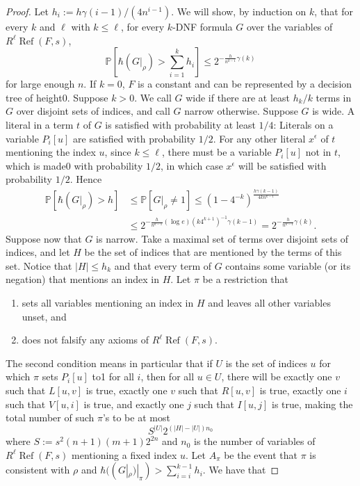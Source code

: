 \documentclass[10pt,a4paper]{article}
\renewcommand{\Ref}{\operatorname{Ref}}
\begin{document}
\begin{proof}
Let $h_i:=h\gamma(i-1)/(4n^{i-1})$. We will show, by induction on $k$, that for every $k$ and $\ell$ with $k\le\ell$, for every $k$-DNF formula $G$ over the variables of $R^\ell\Ref(F,s)$,
\[\mathbb P\left[\hbar(G|_\rho)>\sum_{i=1}^kh_i\right]\le2^{-\frac h{n^{k-1}}\gamma(k)}\]
for large enough $n$.
If $k=0$, $F$ is a constant and can be represented by a decision tree of height0. Suppose $k>0$. We call $G$ wide if there are at least $h_k/k$ terms in $G$ over disjoint sets of indices, and call $G$ narrow otherwise. Suppose $G$ is wide. A literal in a term $t$ of $G$ is satisfied with probability at least $1/4$: Literals on a variable $P_i[u]$ are satisfied with probability $1/2$. For any other literal $x^\epsilon$ of $t$ mentioning the index $u$, since $k\le\ell$, there must be a variable $P_i[u]$ not in $t$, which is made0 with probability $1/2$, in which case $x^\epsilon$ will be satisfied with probability $1/2$. Hence
\begin{align*}
\mathbb P[\hbar(G|_\rho)>h]&\le\mathbb P[G|_\rho\ne1]\le(1-4^{-k})^{\frac{h\gamma(k-1)}{4kn^{k-1}}}\\
&\le2^{-\frac h{n^{k-1}}(\log e)(k4^{k+1})^{-1}\gamma(k-1)}=2^{-\frac h{n^{k-1}}\gamma(k)}.
\end{align*}
Suppose now that $G$ is narrow. Take a maximal set of terms over disjoint sets of indices, and let $H$ be the set of indices that are mentioned by the terms of this set. Notice that $|H|\le h_k$ and that every term of $G$ contains some variable (or its negation) that mentions an index in $H$. Let $\pi$ be a restriction that
\begin{enumerate}\item sets all variables mentioning an index in $H$ and leaves all other variables unset, and\item does not falsify any axioms of $R^\ell\Ref(F,s)$.\end{enumerate}
The second condition means in particular that if $U$ is the set of indices $u$ for which $\pi$ sets $P_i[u]$ to1 for all $i$, then for all $u\in U$, there will be exactly one $v$ such that $L[u,v]$ is true, exactly one $v$ such that $R[u,v]$ is true, exactly one $i$ such that $V[u,i]$ is true, and exactly one $j$ such that $I[u,j]$ is true, making the total number of such $\pi$'s to be at most
\[S^{|U|}2^{(|H|-|U|)n_0}\]
where $S:=s^2(n+1)(m+1)2^{2n}$ and $n_0$ is the number of variables of $R^\ell\Ref(F,s)$ mentioning a fixed index $u$.
Let $A_\pi$ be the event that $\pi$ is consistent with $\rho$ and $\hbar((G|_\rho)|_\pi)>\sum_{i=i}^{k-1}h_i$. We have that

\end{proof}
\end{document}
